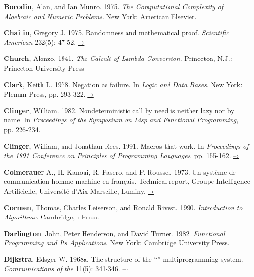 { \label{Borodin and Munro (1975)}
\textbf{Borodin}, Alan, and Ian Munro.  1975.  \textit{The
  Computational Complexity of
Algebraic and Numeric Problems}. New York: American Elsevier.

 \label{Chaitin 1975}
\textbf{Chaitin}, Gregory J.  1975.  Randomness and mathematical proof.
\textit{Scientific American} 232(5): 47-52.
\href{https://www.cs.auckland.ac.nz/~chaitin/sciamer.html}{–›}

 \label{Church (1941)}
\textbf{Church}, Alonzo.  1941.  \textit{The Calculi of
Lambda-Conversion}.  Princeton,
N.J.: Princeton University Press.

 \label{Clark (1978)}
\textbf{Clark}, Keith L.  1978.  Negation as failure.  In
\textit{Logic and Data Bases}.
New York: Plenum Press, pp. 293-322.
\href{http://www.doc.ic.ac.uk/~klc/neg.html}{–›}

 \label{Clinger (1982)}
\textbf{Clinger}, William.  1982.  Nondeterministic call by need is
neither lazy nor by
name. In \textit{Proceedings of the  Symposium on Lisp and
Functional Programming}, pp. 226-234.

 \label{Clinger and Rees 1991}
\textbf{Clinger}, William, and Jonathan Rees.  1991.  Macros that work.  In
\textit{Proceedings of the 1991  Conference on Principles of
Programming Languages}, pp. 155-162.
\href{http://mumble.net/~jar/pubs/macros_that_work.ps}{–›}

 \label{Colmerauer et al. 1973}
\textbf{Colmerauer} A., H. Kanoui, R. Pasero, and P. Roussel.
1973.  Un syst\`eme de
communication homme-machine en fran\c{c}ais.  Technical report, Groupe
Intelligence Artificielle, Universit\'e d'Aix Marseille, Luminy.
\href{http://alain.colmerauer.free.fr/alcol/ArchivesPublications/HommeMachineFr/HoMa.pdf}{–›}

 \label{Cormen et al. 1990}
\textbf{Cormen}, Thomas, Charles Leiserson, and Ronald Rivest.
1990. \textit{Introduction
to Algorithms}. Cambridge, :  Press.

 \label{Darlington et al. 1982}
\textbf{Darlington}, John, Peter Henderson, and David Turner.
1982.  \textit{Functional
Programming and Its Applications}. New York: Cambridge University Press.

 \label{Dijkstra 1968a}
\textbf{Dijkstra}, Edsger W. 1968a.  The structure of the ``''
multiprogramming system.  \textit{Communications of the }
11(5): 341-346.
\href{http://www.cs.utexas.edu/users/EWD/ewd01xx/EWD196.PDF}{–›}

}
